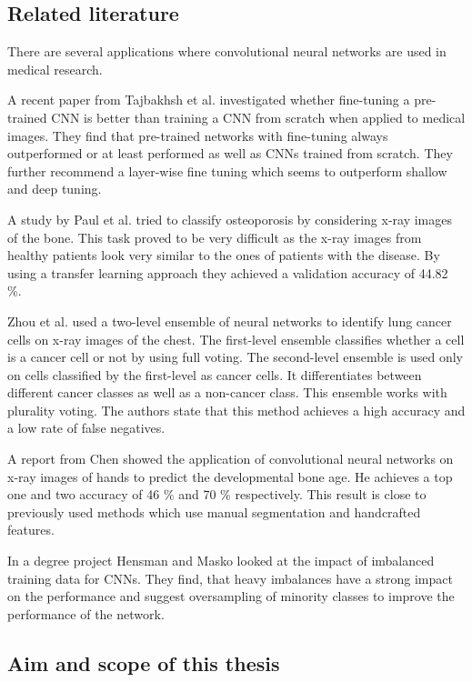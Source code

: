 \documentclass[12pt]{article}
\begin{document}
\subsection{Related literature}


There are several applications where convolutional neural networks are used in medical research.

A recent paper from Tajbakhsh et al. \cite{tajbakhsh_2017} investigated whether fine-tuning a pre-trained CNN is better than training a CNN from scratch when applied to medical images. They find that pre-trained networks with fine-tuning always outperformed or at least performed as well as CNNs trained from scratch. They further recommend a layer-wise fine tuning which seems to outperform shallow and deep tuning.

A study by Paul et al. \cite{paul_2017} tried to classify osteoporosis by considering x-ray images of the bone. This task proved to be very difficult as the x-ray images from healthy patients look very similar to the ones of patients with the disease. By using a transfer learning approach they achieved a validation accuracy of 44.82 \%.

Zhou et al. \cite{zhou_2002} used a two-level ensemble of neural networks to identify lung cancer cells on x-ray images of the chest. The first-level ensemble classifies whether a cell is a cancer cell or not by using full voting. The second-level ensemble is used only on cells classified by the first-level as cancer cells. It differentiates between different cancer classes as well as a non-cancer class. This ensemble works with plurality voting. The authors state that this method achieves a high accuracy and a low rate of false negatives.

A report from Chen \cite{chen_2016} showed the application of convolutional neural networks on x-ray images of hands to predict the developmental bone age. He achieves a top one and two accuracy of 46 \% and 70 \% respectively. This result is close to previously used methods which use manual segmentation and handcrafted features.

In a degree project Hensman and Masko \cite{hensman_2015} looked at the impact of imbalanced training data for CNNs. They find, that heavy imbalances have a strong impact on the performance and suggest oversampling of minority classes to improve the performance of the network.

\subsection{Aim and scope of this thesis}
\end{document}
